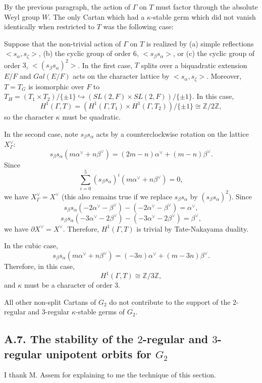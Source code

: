 \documentclass[12pt,letterpaper]{amsart}
\begin{document}
By the previous paragraph, the action of $\Gamma$ on $T$ must factor
through the absolute Weyl group $W$. The only Cartan which had
a $\kappa$-stable germ which did not vanish identically when restricted
to $T$ was the following case:

\noindent
Suppose that the non-trivial action of $\Gamma$ on $T$ is realized
by (a) simple reflections $<s_\alpha,s_\zeta>$, (b) the cyclic group
of order $6$, $<s_\beta s_\alpha>$, or (c) the cyclic group
of order $3$, $<(s_\beta s_\alpha)^2>$.
In the first case, $T$ splits over a
biquadratic extension $E/F$ and $Gal(E/F)$ acts on the character lattice
by $<s_\alpha,s_\zeta>$. Moreover, $T=T_G$ is isomorphic over $F$
to $T_H=(T_1\times T_2)/\{\pm 1\}
\hookrightarrow (SL(2,F)\times SL(2,F))/\{\pm 1\}$.
In this case,
\[
H^1(\Gamma,T)=(H^1(\Gamma,T_1)\times H^1(\Gamma,T_2))/\{\pm 1\}
\cong {\mathbb Z}/2{\mathbb Z},
\]
so the character $\kappa$ must be quadratic.

In the second case, note $s_\beta s_\alpha$ acts by a counterclockwise
rotation on the lattice $X_\Gamma^{\vee}$:
\[
s_\beta s_\alpha (m\alpha^{\vee}+n\beta^{\vee})=
(2m-n)\alpha^{\vee}+(m-n)\beta^{\vee}.
\]
Since
\[
\sum_{i=0}^5(s_\beta s_\alpha)^i (m\alpha^{\vee}+n\beta^{\vee})=0,
\]
we have $X_\Gamma^{\vee}=X^{\vee}$ (this also remains true if we replace
$s_\beta s_\alpha$ by $(s_\beta s_\alpha)^2$). Since
\[
s_\beta s_\alpha (-2\alpha^{\vee}-\beta^{\vee})-(-2\alpha^{\vee}-\beta^{\vee})
=\alpha^{\vee},
\]
\[
s_\beta s_\alpha (-3\alpha^{\vee}-2\beta^{\vee})-
(-3\alpha^{\vee}-2\beta^{\vee})=
\beta^{\vee},
\]
we have $\partial X^{\vee}=X^{\vee}$. Therefore, $H^1(\Gamma,T)$ is trivial by
Tate-Nakayama duality.

In the cubic case,
\[
s_\beta s_\alpha (m\alpha^{\vee}+n\beta^{\vee})=
(-3n)\alpha^{\vee}+(m-3n)\beta^{\vee}.
\]
Therefore, in this case,
\[
H^1(\Gamma,T)\cong {\mathbb Z}/3{\mathbb Z},
\]
and $\kappa$ must be a character of order $3$.

All other non-split Cartans of $G_2$ do not contribute to the support
of the $2$-regular and $3$-regular $\kappa$-stable germs of $G_2$.

\subsection*{A.7. The stability of the $2$-regular and $3$-regular
unipotent orbits for $G_2$}

I thank M. Assem for explaining to me the technique of this section.
\end{document}

